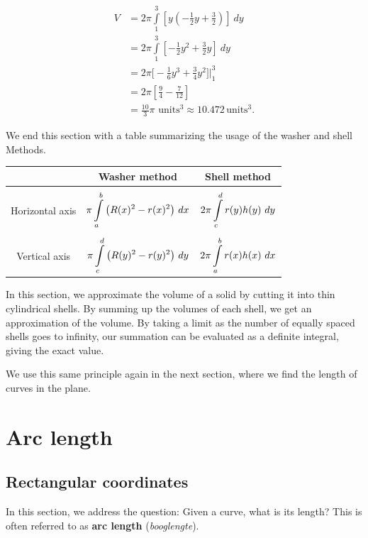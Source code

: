 \begin{example}
\allowdisplaybreaks
\begin{align*}
V &= 2\pi\int\limits_1^3\left[y\left(-\frac12y+\frac32\right)\right]\ dy \\[0.2cm]
	&= 2\pi\int\limits_1^3\left[-\frac12y^2+\frac32y\right]\ dy \\[0.2cm]
  &= 2\pi\Big[-\frac16y^3+\frac34y^2\Big]\Bigg|_1^3 \\[0.2cm]
	&= 2\pi\left[\frac94-\frac7{12}\right]\\[0.2cm]
	&=	\frac{10}{3}\pi  \text{ units}^3 \approx 10.472\, \text{units}^3.
\end{align*}




\end{example}


We end this section with a table summarizing the usage of the washer and shell Methods.
\begin{center}
\begin{tabular}{c|c|c}
 		& Washer method & Shell method\\\hline\hline\\
 Horizontal axis  & $\displaystyle \pi\int\limits_a^b \big(R(x)^2-r(x)^2\big)\ dx$ & $\displaystyle 2\pi\int\limits_c^d r(y)h(y)\ dy$ \\\hline\\
 Vertical axis &  $\displaystyle\pi \int\limits_c^d\big(R(y)^2-r(y)^2\big)\ dy$ & $\displaystyle 2\pi\int\limits_a^b r(x)h(x)\ dx$
 \end{tabular}
\end{center}

In this section, we approximate the volume of a solid by cutting it into thin cylindrical shells. By summing up the volumes of each shell, we get an approximation of the volume. By taking a limit as the number of equally spaced shells goes to infinity, our summation can be evaluated as a definite integral, giving the exact value.

We use this same principle again in the next section, where we find the length of curves in the plane.



\section{Arc length}
\label{sec:arc_length}
\subsection{Rectangular coordinates}
In this section, we address the question: Given a curve, what is its length? This is often referred to as \textbf{arc length} (\textit{booglengte}). 

